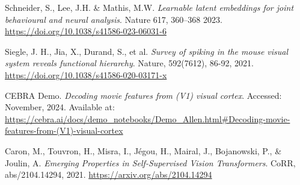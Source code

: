 \documentclass[12pt, letterpaper]{article}
\begin{document}
\newpage
\begin{thebibliography}{9}
    Schneider, S., Lee, J.H. \& Mathis, M.W. \textit{Learnable latent embeddings for joint behavioural and neural analysis}. Nature 617, 360–368 2023. \url{https://doi.org/10.1038/s41586-023-06031-6}

    Siegle, J. H., Jia, X., Durand, S., et al. \textit{Survey of spiking in the mouse visual system reveals functional hierarchy}. Nature, 592(7612), 86-92, 2021. \url{https://doi.org/10.1038/s41586-020-03171-x}
    
    CEBRA Demo. \textit{Decoding movie features from (V1) visual cortex}. Accessed: November, 2024. Available at: \url{https://cebra.ai/docs/demo_notebooks/Demo_Allen.html#Decoding-movie-features-from-(V1)-visual-cortex}

    Caron, M., Touvron, H., Misra, I., Jégou, H., Mairal, J., Bojanowski, P., \& Joulin, A. \textit{Emerging Properties in Self-Supervised Vision Transformers}. CoRR, abs/2104.14294, 2021. \url{https://arxiv.org/abs/2104.14294}

\end{thebibliography}
\end{document}

